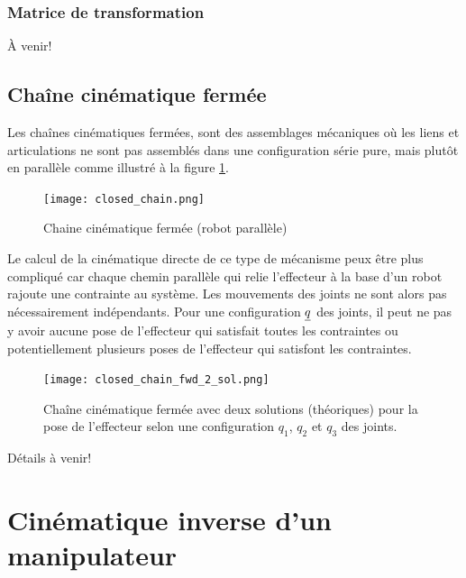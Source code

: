 \subsubsection{Matrice de transformation}

À venir!










\newpage
\subsection{Chaîne cinématique fermée}

Les chaînes cinématiques fermées, sont des assemblages mécaniques où les liens et articulations ne sont pas assemblés dans une configuration série pure, mais plutôt en parallèle comme illustré à la figure \ref{fig:closed_chain}.
\begin{figure}[H]
	\centering
		\texttt{[image: closed\_chain.png]}
	\caption{Chaine cinématique fermée (robot parallèle)}
	\label{fig:closed_chain}
\end{figure}

Le calcul de la cinématique directe de ce type de mécanisme peux être plus compliqué car chaque chemin parallèle qui relie l'effecteur à la base d'un robot rajoute une contrainte au système. Les mouvements des joints ne sont alors pas nécessairement indépendants. Pour une configuration $\underline{q}$ des joints, il peut ne pas y avoir aucune pose de l'effecteur qui satisfait toutes les contraintes ou potentiellement plusieurs poses de l'effecteur qui satisfont les contraintes.
\begin{figure}[H]
	\centering
		\texttt{[image: closed\_chain\_fwd\_2\_sol.png]}
	\caption{Chaîne cinématique fermée avec deux solutions (théoriques) pour la pose de l'effecteur selon une configuration $q_1$, $q_2$ et $q_3$ des joints. }
	\label{fig:closed_chain_fwd_2_sol}
\end{figure}


Détails à venir!





\newpage
\section{Cinématique inverse d'un manipulateur}
\label{sec:invkin}

